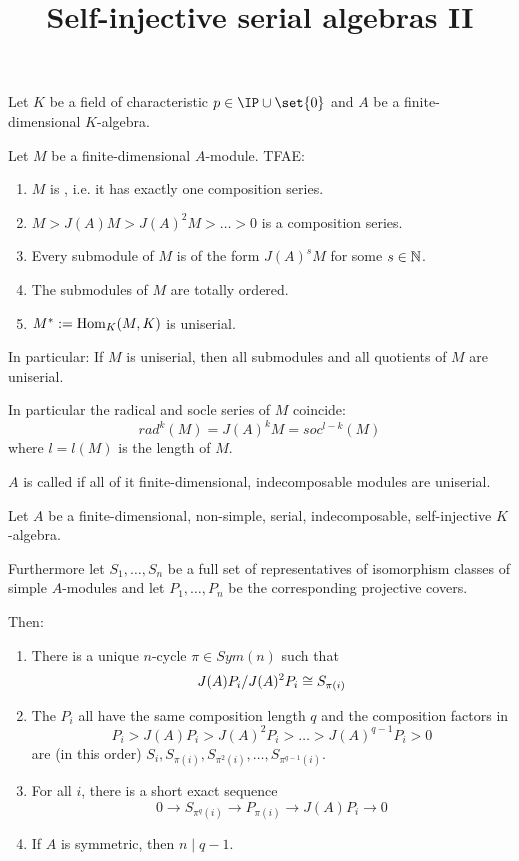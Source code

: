 \documentclass[fontsize=11pt,fleqn,a4paper]{scrartcl}
\title{Self-injective serial algebras II}
\begin{document}
\maketitle

\begin{convention}
Let $K$ be a field of characteristic $p\in\IP\cup\set{0}$ and $A$ be a finite-dimensional $K$-algebra.
\end{convention}

\begin{lemmadef}[Lemma 11.3.1]
Let $M$ be a finite-dimensional $A$-module. TFAE:
\begin{enumerate}
\item $M$ is , i.e. it has exactly one composition series.
\item $M > J(A)M > J(A)^2M > \ldots > 0$ is a composition series.
\item Every submodule of $M$ is of the form $J(A)^sM$ for some $s\in\mathbb{N}$.
\item The submodules of $M$ are totally ordered.
\item $M^\ast:=\operatorname{Hom}_K(M,K)$ is uniserial.
\end{enumerate}
In particular: If $M$ is uniserial, then all submodules and all quotients of $M$ are uniserial.
\end{lemmadef}

\begin{remark}
In particular the radical and socle series of $M$ coincide:
\[rad^k(M) = J(A)^kM = soc^{l-k}(M)\] 
where $l=l(M)$ is the length of $M$.
\end{remark}

\begin{definition}
$A$ is called  if all of it finite-dimensional, indecomposable modules are uniserial.
\end{definition}

\begin{theorem}[11.3.4]
Let $A$ be a finite-dimensional, non-simple, serial, indecomposable, self-injective $K$-algebra.

Furthermore let $S_1, \ldots, S_n$ be a full set of representatives of isomorphism classes of simple $A$-modules and let $P_1,\ldots, P_n$ be the corresponding projective covers.

Then:
\begin{enumerate}
\item There is a unique $n$-cycle $\pi\in Sym(n)$ such that
\[J(A)P_i / J(A)^2P_i \cong S_{\pi(i)}\]
\item The $P_i$ all have the same composition length $q$ and the composition factors in
\[P_i > J(A)P_i > J(A)^2P_i > \ldots > J(A)^{q-1}P_i > 0\]
are (in this order) $S_i, S_{\pi(i)}, S_{\pi^2(i)}, \ldots, S_{\pi^{q-1}(i)}$.
\item For all $i$, there is a short exact sequence
\[0 \to S_{\pi^q(i)} \to P_{\pi(i)} \to J(A)P_i \to 0\]
\item If $A$ is symmetric, then $n \mid q-1$.
\end{enumerate}
\end{theorem}
\end{document}
